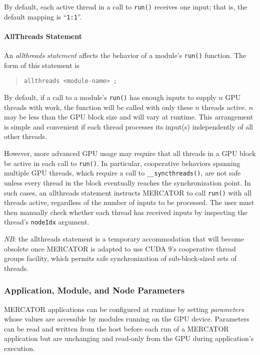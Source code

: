 \documentclass[11pt]{article}
\begin{document}
By default, each active thread in a call to \texttt{run()} receives
one input; that is, the default mapping is ``\texttt{1:1}''.

\paragraph*{AllThreads Statement}
An \emph{allthreads statement} affects the behavior of a module's
\texttt{run()} function.  The form of this statement is
\begin{quote}
\texttt{allthreads <module-name> ;}
\end{quote}

By default, if a call to a module's \texttt{run()} has enough inputs
to supply $n$ GPU threads with work, the function will be called with
only these $n$ threads active.  $n$ may be less than the GPU block
size and will vary at runtime.  This arrangement is simple and
convenient if each thread processes its input(s) independently of all
other threads. 

However, more advanced GPU usage may require that all threads in a GPU
block be active in each call to \texttt{run()}.  In particular,
cooperative behaviors spanning multiple GPU threads, which require a
call to \texttt{__syncthreads()}, are not safe unless every thread in
the block eventually reaches the synchronization point.  In such
cases, an allthreads statement instructs MERCATOR to call
\texttt{run()} with all threads active, regardless of the number of
inputs to be processed.  The user must then manually check whether
each thread has received inputs by inspecting the thread's
\texttt{nodeIdx} argument.

\textit{NB}: the allthreads statement is a temporary accommodation
that will become obsolete once MERCATOR is adapted to use CUDA 9's
cooperative thread groups facility, which permits safe synchronization
of sub-block-sized sets of threads.

\subsubsection{Application, Module, and Node Parameters}

MERCATOR applications can be configured at runtime by setting
\emph{parameters} whose values are accessible by modules running on
the GPU device.  Parameters can be read and written from the host
before each run of a MERCATOR application but are unchanging and
read-only from the GPU during application's execution.
\end{document}
